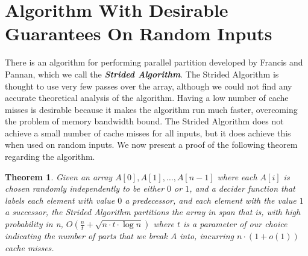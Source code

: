 \documentclass[twocolumn, twoside, 12pt]{article}
\newcommand{\defn}[1]       {{\textit{\textbf{\boldmath #1}}}}
\newtheorem{theorem}{Theorem}
\begin{document}
	
\section{Algorithm With Desirable Guarantees On Random Inputs}
There is an algorithm for performing parallel partition developed by Francis and Pannan, which we call the \defn{Strided Algorithm}.
The Strided Algorithm is thought to use very few passes over the array, although we could not find any accurate theoretical analysis of the algorithm.
Having a low number of cache misses is desirable because it makes the algorithm run much faster, overcoming the problem of memory bandwidth bound.
The Strided Algorithm does not achieve a small number of cache misses for all inputs, but it does achieve this when used on random inputs.
We now present a proof of the following theorem regarding the algorithm.

\begin{theorem}
Given an array $A[0], A[1], \ldots, A[n-1]$ where each $A[i]$ is chosen randomly independently to be either $0$ or $1$, and a decider function that labels each element with value $0$ a predecessor, and each element with the value $1$ a successor, the Strided Algorithm partitions the array in span that is, with high probability in n, $O(\frac{n}{t}+\sqrt{n\cdot t\cdot\log n})$ where $t$ is a parameter of our choice indicating the number of parts that we break $A$ into, incurring $n\cdot(1+o(1))$ cache misses.
\label{thm:stridedAlg}
\end{theorem}
\end{document}
